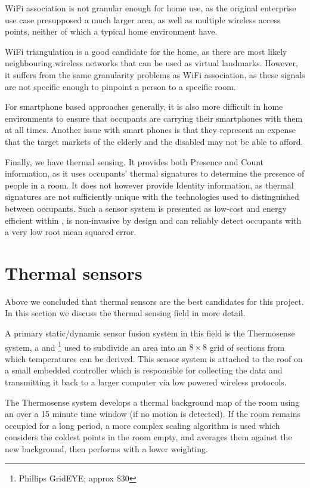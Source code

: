 \documentclass[../thesis/thesis.tex]{subfiles}
\begin{document}
WiFi association is not granular enough for home use, as the original enterprise use case presupposed a much larger area, as well as multiple wireless access points, neither of which a typical home environment have.

WiFi triangulation is a good candidate for the home, as there are most likely neighbouring wireless networks that can be used as virtual landmarks. However, it suffers from the same granularity problems as WiFi association, as these signals are not specific enough to pinpoint a person to a specific room.

For smartphone based approaches generally, it is also more difficult in home environments to ensure that occupants are carrying their smartphones with them at all times.  Another issue with smart phones is that they represent an expense that the target markets of the elderly and the disabled may not be able to afford.

Finally, we have thermal sensing. It provides both Presence and Count information, as it uses occupants' thermal signatures to determine the presence of people in a room. It does not however provide Identity information, as thermal signatures are not sufficiently unique with the technologies used to distinguished between occupants. Such a sensor system is presented as low-cost and energy efficient within \cite{beltran2013thermosense}, is non-invasive by design and can reliably detect occupants with a very low root mean squared error.

\section{Thermal sensors}
\label{sec:litreview:thermalsensors}
Above we concluded that thermal sensors are the best candidates for this project. In this section we discuss the thermal sensing field in more detail.

A primary static/dynamic sensor fusion system in this field is the Thermosense system, \cite{beltran2013thermosense} a \pir and \iar\footnote{Phillips GridEYE; approx \$30} used to subdivide an area into an $8\times8$ grid of sections from which temperatures can be derived. This sensor system is attached to the roof on a small embedded controller which is responsible for collecting the data and transmitting it back to a larger computer via low powered wireless protocols.

The Thermosense system develops a thermal background map of the room using an \emwa over a 15 minute time window (if no motion is detected). If the room remains occupied for a long period, a more complex scaling algorithm is used which considers the coldest points in the room empty, and averages them against the new background, then performs \emwa with a lower weighting.
\end{document}

